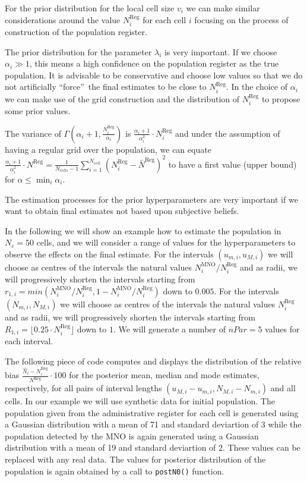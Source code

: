 \documentclass[12pt, a4paper]{article}
\begin{document}
For the prior distribution for the local cell size $v_{i}$ we can make similar 
considerations around the value $N_{i}^{\textrm{Reg}}$ for each cell $i$ focusing on the 
process of construction of the population register.

The prior distribution for the parameter $\lambda_{i}$ is very important. 
If we choose $\alpha_{i}\gg 1$, this means a high confidence on 
the population register as the true population. It is advisable to be conservative 
and choose low values so that we do not artificially  \textquotedblleft force\textquotedblright\ 
the final estimates to be close to $N_{i}^{\textrm{Reg}}$. In the choice of $\alpha_{i}$ we can make 
use of the grid construction and the distribution 
of $N_{i}^{\textrm{Reg}}$ to propose some prior values. 

The variance of $\Gamma(\alpha_{i} + 1, \frac{N^{\textrm{Reg}}_{i}}{\alpha_{i}})$ 
is $\frac{\alpha_{i} + 1}{\alpha_{i}^{2}}\cdot N^{\textrm{Reg}}_{i}$ and under the 
assumption of having a regular grid over the population, we can equate 
$\frac{\alpha_{i} + 1}{\alpha_{i}^{2}}\cdot N^{\textrm{Reg}}=\frac{1}{N_{cells} - 1}\sum_{i=1}^{N_{cell}}\left(N_{i}^{\textrm{Reg}} - \bar{N}^{\textrm{Reg}}\right)^{2}$
to have a first value (upper bound) for $\alpha\leq\min_{i}\alpha_{i}$. 

The estimation processes for the prior hyperparameters are very important if we want to obtain 
final estimates not based upon subjective beliefs.

In the following we will show an example how to estimate the population in $N_{c}=50$ cells, 
and we will consider a range of values for the hyperparameters to observe the effects on the final estimate.
For the intervals $(u_{m,i}, u_{M,i})$ we will choose as centres of the intervals the 
natural values $N^{\textrm{MNO}}_{i} / N^{\textrm{Reg}}_{i}$ and as radii, we will progressively 
shorten the intervals starting from $r_{1,i}=min(N^{\textrm{MNO}}_{i} / N^{\textrm{Reg}}_{i}, 1- N^{\textrm{MNO}}_{i} / N^{\textrm{Reg}}_{i})$ down to $0.005$.
For the intervals $(N_{m,i}, N_{M,i})$ we will choose as centres of the intervals the natural 
values $N^{\textrm{Reg}}_{i}$ and as radii, we will progressively shorten the intervals starting 
from $R_{1,i}=\lfloor 0.25\cdot N^{\textrm{Reg}}_{i}\rfloor$ down to $1$. We will generate a number
of $nPar=5$ values for each interval.

The following piece of code computes and displays the distribution of the relative 
bias $\frac{\hat{N}_{i}-N^{\textrm{Reg}}_{i}}{N^{\textrm{Reg}}} \cdot 100$ for the posterior mean, 
median and mode estimates, respectively, 
for all pairs of interval lengths $(u_{M,i}-u_{m,i}, N_{M,i} - N_{m,i})$ and all cells. 
In our example we will use synthetic data for initial population. The population given from the administrative 
register for each cell is generated using a Gaussian distribution with a mean of 71 and standard deviartion of 3 while
the population detected by the MNO is again generated using a Gaussian distribution 
with a mean of 19 and standard deviartion of 2. These values can be replaced with any real data.
The values for posterior 
distribution of the population is again obtained by a call to \texttt{postN0()} function. 
\end{document}
